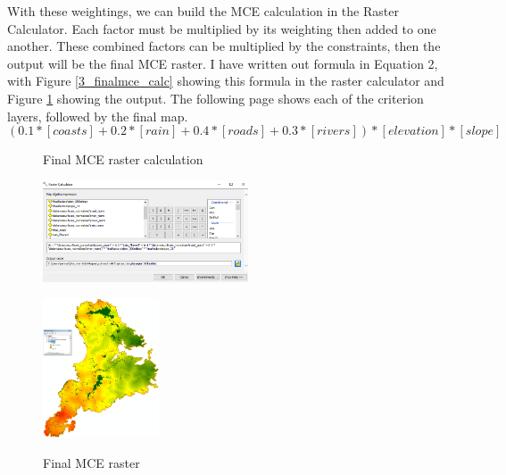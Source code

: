 \documentclass{article}
\begin{document}
With these weightings, we can build the MCE calculation in the Raster Calculator. Each factor must be multiplied by its weighting then added to one another. These combined factors can be multiplied by the constraints, then the output will be the final MCE raster. I have written out formula in Equation 2, with Figure \ref{3_finalmce_calc} showing this formula in the raster calculator and Figure \ref{3_finalmce_output} showing the output. The following page shows each of the criterion layers, followed by the final map.\\
\begin{equation}
  (0.1*[coasts]+0.2*[rain]+0.4*[roads]+0.3*[rivers])*[elevation]*[slope]
\end{equation}
\begin{figure}[h]
  \centering
  \begin{minipage}[b]{0.5\textwidth}
    \centering
    \caption{Final MCE raster calculation}
    \includegraphics[width=230px]{images/part3/finalmce_calc.PNG}
    \label{3_finalmce_calc}
  \end{minipage}
  \hfill
  \begin{minipage}[b]{0.4\textwidth}
    \centering
    \caption{Final MCE raster}
    \includegraphics[width=130px]{images/part3/finalmce_output.PNG}
    \label{3_finalmce_output}
  \end{minipage}
\end{figure}
\pagebreak
\end{document}
